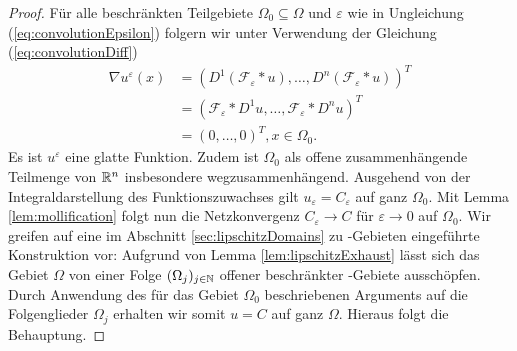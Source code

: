 \begin{proof}
  Für alle beschränkten Teilgebiete $\Omega_0 \subseteq \Omega$ und $\varepsilon$ wie in Ungleichung (\ref{eq:convolutionEpsilon}) folgern wir unter Verwendung der Gleichung (\ref{eq:convolutionDiff})
  \begin{align*}
    \nabla u^\varepsilon(x)
    &= (D^1 (\mathcal{F}_\varepsilon \ast u), \dots, D^n (\mathcal{F}_\varepsilon \ast u))^T \\
    &= ( \mathcal{F}_\varepsilon \ast D^1 u, \dots, \mathcal{F}_\varepsilon \ast D^n u)^T \\
    &= (0, \dots, 0)^T, x \in \Omega_0.
  \end{align*}
  Es ist $u^\varepsilon$ eine glatte Funktion.
  Zudem ist $\Omega_0$ als offene zusammenhängende Teilmenge von $\mathbb{R}^n$ insbesondere wegzusammenhängend.
  Ausgehend von der Integraldarstellung des Funktionszuwachses \cite[S.57]{koenigsberger2004ana2} gilt $u_\varepsilon = C_\varepsilon$ auf ganz $\Omega_0$.
  Mit Lemma \ref{lem:mollification} folgt nun die Netzkonvergenz $C_\varepsilon \to C$ für $\varepsilon \to 0$ auf $\Omega_0$.
  Wir greifen auf eine im Abschnitt \ref{sec:lipschitzDomains} zu \lipschitz\hyp{}Gebieten eingeführte Konstruktion vor:
  Aufgrund von Lemma \ref{lem:lipschitzExhaust} lässt sich das Gebiet $\Omega$ von einer Folge $(\Omega_j)_{j \in \mathbb{N}}$ offener beschränkter \lipschitz\hyp{}Gebiete ausschöpfen. 
  Durch Anwendung des für das Gebiet $\Omega_0$ beschriebenen Arguments auf die Folgenglieder $\Omega_j$ erhalten wir somit $u = C$ auf ganz $\Omega$. 
  Hieraus folgt die Behauptung.
\end{proof}

